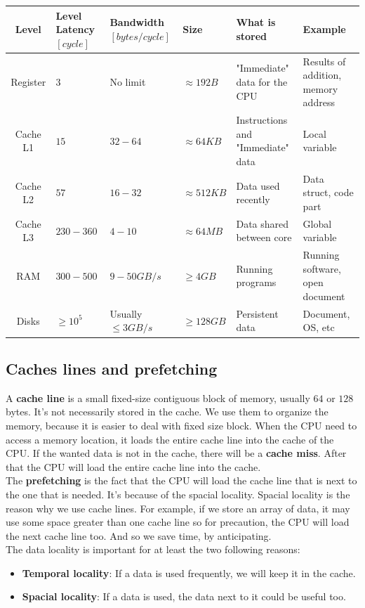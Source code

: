 \documentclass[12pt, openany]{report}
\theoremstyle{definition}
\begin{document}
\begin{tabularx}{\textwidth}{|c|X|X|X|X|X|}
	\hline
	Level & Level \newline Latency $[cycle]$  & Bandwidth $[bytes/cycle]$ & Size & What \newline is stored & Example \\
	\hline
	Register & $3$ & No limit & $\approx 192B$ & "Immediate" data for the CPU & Results of addition, memory address\\
	\hline
	Cache L1 & $15$ & $32-64$ & $\approx 64KB$ & Instructions and \newline "Immediate" data & Local \newline variable\\
	\hline
	Cache L2 & $57$ & $16-32$ & $\approx 512KB$ & Data used recently & Data struct, code part\\
	\hline
	Cache L3 & $230-360$ & $4-10$ & $\approx 64MB$ & Data shared between core& Global \newline variable\\
	\hline
	RAM & $300-500$ & $9-50GB/s$ & $\geq 4GB$ & Running programs & Running software, open \newline document\\
	\hline
	Disks & $\geq 10^5$ & Usually $\leq 3GB/s$ & $\geq 128GB$ & Persistent data & Document, OS, etc\\
	\hline
\end{tabularx}
\subsection{Caches lines and prefetching}\label{caches_lines}
A \textbf{cache line} is a small fixed-size contiguous block of memory, usually $64$ or $128$ bytes. It's not necessarily stored in the cache. We use them to organize the memory, because it is easier to deal with fixed size block. When the CPU need to access a memory location, it loads the entire cache line into the cache of the CPU.
If the wanted data is not in the cache, there will be a \textbf{cache miss}. After that the CPU will load the entire cache line into the cache.\\
The \textbf{prefetching} is the fact that the CPU will load the cache line that is next to the one that is needed. It's because of the spacial locality. Spacial locality is the reason why we use cache lines. For example, if we store an array of data, it may use some space greater than one cache line so for precaution, the CPU will load the next cache line too. And so we save time, by anticipating.\\
The data locality is important for at least the two following reasons:
\begin{itemize}
	\item \textbf{Temporal locality}: If a data is used frequently, we will keep it in the cache.
	\item \textbf{Spacial locality}: If a data is used, the data next to it could be useful too.
\end{itemize}
\newpage
\end{document}
